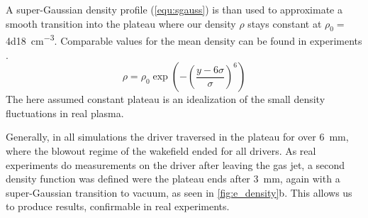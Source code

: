 \documentclass[bachelor_thesis]{subfiles}
\begin{document}
A super-Gaussian density profile (\autoref{equ:sgauss}) is than used to approximate a smooth transition into the plateau where our density $\rho$ stays constant at $\rho_0 =$ \qty{4d18}{\cm^{-3}}. Comparable values for the mean density can be found in experiments \cite{Schoebel2022, Kurz2021}.
\begin{equation}
	\rho = \rho_0 \exp\left(-\left(\frac{y-6\sigma}{\sigma}\right)^6\right)
	\label{equ:sgauss}
\end{equation}
The here assumed constant plateau is an idealization of the small density fluctuations in real plasma.

Generally, in all simulations the driver traversed in the plateau for over \qty{6}{\mm}, where the blowout regime of the wakefield ended for all drivers. As real experiments do measurements on the driver after leaving the gas jet,
a second density function was defined were the plateau ends after \qty{3}{\mm}, again with a super-Gaussian transition to vacuum, as seen in \autoref{fig:e_density}b.
This allows us to produce results, confirmable in real experiments.
\end{document}
